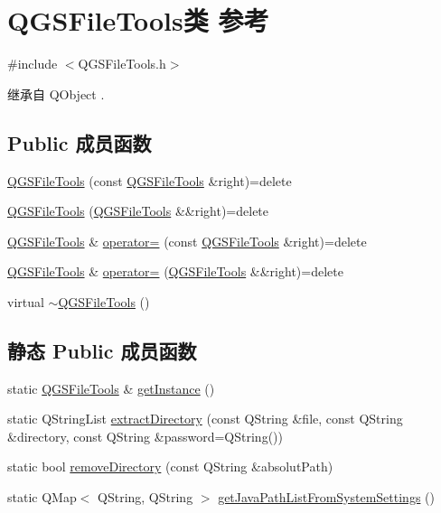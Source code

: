 \hypertarget{class_q_g_s_file_tools}{}\section{Q\+G\+S\+File\+Tools类 参考}
\label{class_q_g_s_file_tools}


{\ttfamily \#include $<$Q\+G\+S\+File\+Tools.\+h$>$}



继承自 Q\+Object .

\subsection*{Public 成员函数}
\begin{DoxyCompactItemize}
\item 
\mbox{\hyperlink{class_q_g_s_file_tools_ada105c6c376d864b9bcf8c405c9a3393}{Q\+G\+S\+File\+Tools}} (const \mbox{\hyperlink{class_q_g_s_file_tools}{Q\+G\+S\+File\+Tools}} \&right)=delete
\item 
\mbox{\hyperlink{class_q_g_s_file_tools_a760b6e4bca19006dae047411202dd39b}{Q\+G\+S\+File\+Tools}} (\mbox{\hyperlink{class_q_g_s_file_tools}{Q\+G\+S\+File\+Tools}} \&\&right)=delete
\item 
\mbox{\hyperlink{class_q_g_s_file_tools}{Q\+G\+S\+File\+Tools}} \& \mbox{\hyperlink{class_q_g_s_file_tools_a35ece98fa9b5f34bfddc0fdafed68367}{operator=}} (const \mbox{\hyperlink{class_q_g_s_file_tools}{Q\+G\+S\+File\+Tools}} \&right)=delete
\item 
\mbox{\hyperlink{class_q_g_s_file_tools}{Q\+G\+S\+File\+Tools}} \& \mbox{\hyperlink{class_q_g_s_file_tools_ab282e175125c1be27b567b081cb3ddfa}{operator=}} (\mbox{\hyperlink{class_q_g_s_file_tools}{Q\+G\+S\+File\+Tools}} \&\&right)=delete
\item 
virtual \mbox{\hyperlink{class_q_g_s_file_tools_a314c8cd3a1c0ab9404b8dc2f57e27f79}{$\sim$\+Q\+G\+S\+File\+Tools}} ()
\end{DoxyCompactItemize}
\subsection*{静态 Public 成员函数}
\begin{DoxyCompactItemize}
\item 
static \mbox{\hyperlink{class_q_g_s_file_tools}{Q\+G\+S\+File\+Tools}} \& \mbox{\hyperlink{class_q_g_s_file_tools_a679f7d19d6847e85438e924d94784384}{get\+Instance}} ()
\item 
static Q\+String\+List \mbox{\hyperlink{class_q_g_s_file_tools_a388d961a6c2ea3a9c84f032be758fe7e}{extract\+Directory}} (const Q\+String \&file, const Q\+String \&directory, const Q\+String \&password=Q\+String())
\item 
static bool \mbox{\hyperlink{class_q_g_s_file_tools_a72117ea1162c9826f802a8de7424abb4}{remove\+Directory}} (const Q\+String \&absolut\+Path)
\item 
static Q\+Map$<$ Q\+String, Q\+String $>$ \mbox{\hyperlink{class_q_g_s_file_tools_aad16dd5f907b94143db29b3f0b3dbc22}{get\+Java\+Path\+List\+From\+System\+Settings}} ()
\end{DoxyCompactItemize}


